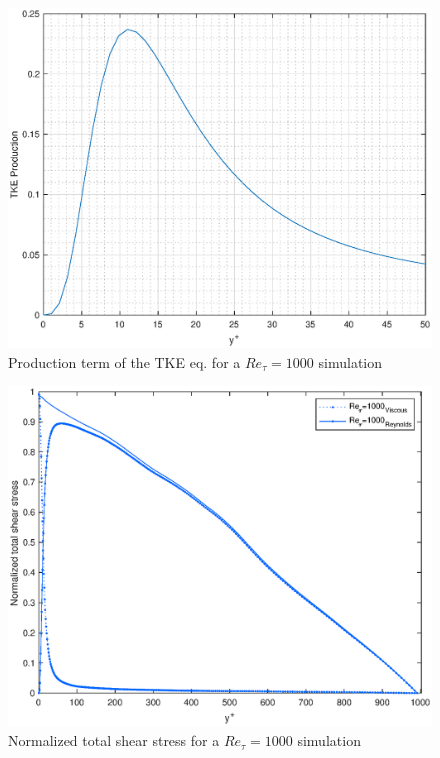 \begin{figure}
\begin{center}
\includegraphics[scale=0.55]{grafici/tke_prod_1000.eps}
\caption{Production term of the TKE eq. for a $Re_{\tau}=1000$ simulation}
\label{tke:prod:1000}
\end{center} 
\end{figure}

\begin{figure}
\begin{center}
\includegraphics[scale=0.55]{grafici/stresses_1000.eps}
\caption{Normalized total shear stress for a $Re_{\tau}=1000$ simulation}
\label{stresses:1000}
\end{center} 
\end{figure}